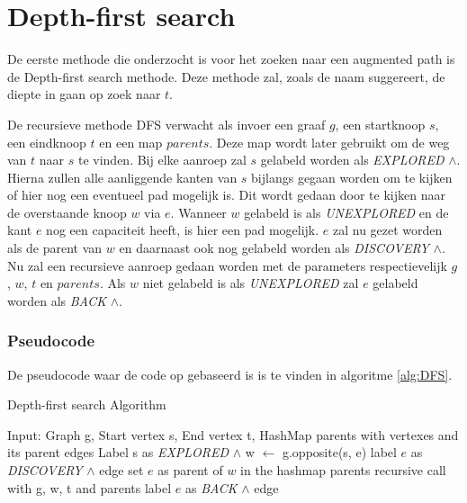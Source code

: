 \chapter{Depth-first search}
\label{chap:depthfirst}

De eerste methode die onderzocht is voor het zoeken naar een augmented path is de Depth-first search methode. Deze methode zal, zoals de naam suggereert, de diepte in gaan op zoek naar $t$. 

De recursieve methode DFS verwacht als invoer een graaf $g$, een startknoop $s$, een eindknoop $t$ en een map $parents$. Deze map wordt later gebruikt om de weg van $t$ naar $s$ te vinden. Bij elke aanroep zal $s$ gelabeld worden als \textit{EXPLORED} $\land$. Hierna zullen alle aanliggende kanten van $s$ bijlangs gegaan worden om te kijken of hier nog een eventueel pad mogelijk is. Dit wordt gedaan door te kijken naar de overstaande knoop $w$ via $e$. Wanneer $w$ gelabeld is als \textit{UNEXPLORED} en de kant $e$ nog een capaciteit heeft, is hier een pad mogelijk. $e$ zal nu gezet worden als de parent van $w$ en daarnaast ook nog gelabeld worden als \textit{DISCOVERY} $\land$. Nu zal een recursieve aanroep gedaan worden met de parameters respectievelijk $g$, $w$, $t$ en $parents$.
Als $w$ niet gelabeld is als \textit{UNEXPLORED} zal $e$ gelabeld worden als \textit{BACK} $\land$.

\subsection{Pseudocode}
De pseudocode waar de code op gebaseerd is is te vinden in algoritme \ref{alg:DFS}.

\begin{algorithm}[h]
\caption{Depth-first search Algorithm}
\label{alg:DFS}
\begin{algorithmic}
\REQUIRE Input: Graph g, Start vertex s, End vertex t, HashMap parents with vertexes and its parent edges
\STATE Label s as \textit{EXPLORED} $\land$
\STATE w $\gets$ g.opposite(s, e)
\STATE label $e$ as \textit{DISCOVERY} $\land$ edge
\STATE set $e$ as parent of $w$ in the hashmap parents
\STATE recursive call with g, w, t and parents
\ELSE
\STATE label $e$ as \textit{BACK} $\land$ edge
\ENDIF
\ENDIF
\ENDFOR
\end{algorithmic}
\end{algorithm}

